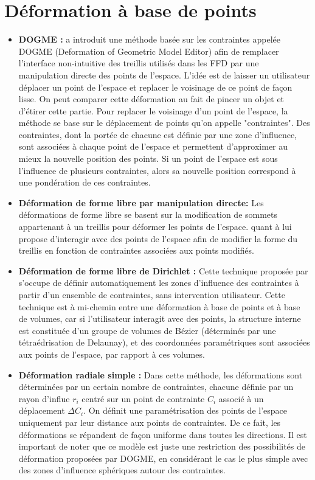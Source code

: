 \section{Déformation à base de points}
\begin{itemize}
\item{\textbf{DOGME :}} \cite{BB91} a introduit une méthode basée sur
  les contraintes appelée DOGME (Deformation of Geometric Model
  Editor) afin de remplacer l'interface non-intuitive des treillis
  utilisés dans les FFD par une manipulation directe des points de
  l'espace. L'idée est de laisser un utilisateur déplacer un point de
  l'espace et replacer le voisinage de ce point de façon lisse. On
  peut comparer cette déformation au fait de pincer un objet et
  d'étirer cette partie. Pour replacer le voisinage d'un point de
  l'espace, la méthode se base sur le déplacement de points qu'on
  appelle "contraintes". Des contraintes, dont la portée de chacune
  est définie par une zone d'influence, sont associées à chaque point
  de l'espace et permettent d'approximer au mieux la nouvelle position
  des points. Si un point de l'espace est sous l'influence de
  plusieurs contraintes, alors sa nouvelle position correspond à une
  pondération de ces contraintes.
\item{\textbf{Déformation de forme libre par manipulation directe:}}
  Les déformations de forme libre se basent sur la modification de
  sommets appartenant à un treillis pour déformer les points de
  l'espace. \cite{HHK92} quant à lui propose d'interagir avec des
  points de l'espace afin de modifier la forme du treillis en fonction
  de contraintes associées aux points modifiés.
\item{\textbf{Déformation de forme libre de Dirichlet :}} Cette
  technique proposée par \cite{MT97} s'occupe de définir
  automatiquement les zones d'influence des contraintes à partir d'un
  ensemble de contraintes, sans intervention utilisateur. Cette
  technique est à mi-chemin entre une déformation à base de points et
  à base de volumes, car si l'utilisateur interagit avec des points,
  la structure interne est constituée d'un groupe de volumes de Bézier
  (déterminés par une tétraédrisation de Delaunay), et des coordonnées
  paramétriques sont associées aux points de l'espace, par rapport à
  ces volumes.
\item{\textbf{Déformation radiale simple :}} Dans cette méthode, les
  déformations sont déterminées par un certain nombre de contraintes,
  chacune définie par un rayon d'influe $r_i$ centré sur un point de
  contrainte $C_i$ associé à un déplacement $\Delta C_i$. On définit
  une paramétrisation des points de l'espace uniquement par leur
  distance aux points de contraintes. De ce fait, les déformations se
  répandent de façon uniforme dans toutes les directions. Il est
  important de noter que ce modèle est juste une restriction des
  possibilités de déformation proposées par DOGME, en considérant le
  cas le plus simple avec des zones d'influence sphériques autour des
  contraintes.
\end{itemize}


